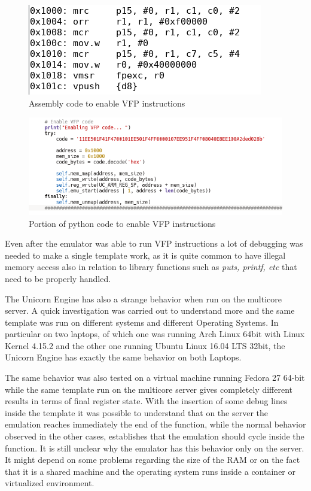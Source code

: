 \documentclass[../main.tex]{subfiles}
\begin{document}
\begin{figure}[htp]
  \centering
  \includegraphics[scale=0.9]{images/vfpdisass.png}
  \caption{Assembly code to enable VFP instructions}
  \label{fig:vfp}
\end{figure}
\begin{figure}[htp]
  \centering
  \includegraphics[scale=0.9]{images/vfpcode.png}
  \caption{Portion of python code to enable VFP instructions}
  \label{fig:vfp1}
\end{figure}

Even after the emulator was able to run VFP instructions a lot of debugging was needed to make a single template work, as it is quite common to have illegal memory access also in relation to library functions such as \textit{puts, printf, etc} that need to be properly handled.

The Unicorn Engine has also a strange behavior when run on the multicore server. A quick investigation was carried out to understand more and the same template was run on different systems and different Operating Systems. In particular on two laptops, of which one was running Arch Linux 64bit with Linux Kernel 4.15.2 and the other one running Ubuntu Linux 16.04 LTS 32bit, the Unicorn Engine has exactly the same behavior on both Laptops.

The same behavior was also tested on a virtual machine running Fedora 27 64-bit while the same template run on the multicore server gives completely different results in terms of final register state. With the insertion of some debug lines inside the template it was possible to understand that on the server the emulation reaches immediately the end of the function, while the normal behavior observed in the other cases, establishes that the emulation should cycle inside the function. It is still unclear why the emulator has this behavior only on the server. It might depend on some problems regarding the size of the RAM or on the fact that it is a shared machine and the operating system runs inside a container or virtualized environment.
\end{document}
